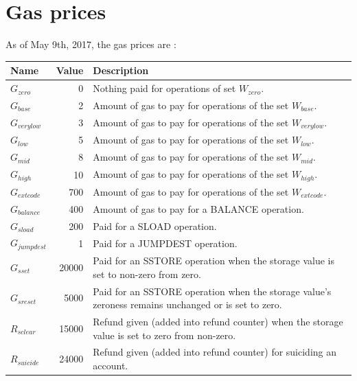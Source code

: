 \documentclass{article}
\begin{document}
	\clearpage


	\appendix

	\section{Gas prices}
		\label{app:gas-prices}

		As of May 9th, 2017, the gas prices are \cite{yellow-paper}: 
		\begin{table}[!ht]
		\footnotesize
		\noindent \begin{tabular}{| l | r | p{8cm} |}
			\hline
			Name 				& Value 	& Description \\ \hline
			$G_{zero}$ 			& 0 		& Nothing paid for operations of set $W_{zero}$. \\ \hline
			$G_{base}$ 			& 2 		& Amount of gas to pay for operations of the set $W_{base}$. \\ \hline
			$G_{verylow}$ 		& 3 		& Amount of gas to pay for operations of the set $W_{verylow}$. \\ \hline
			$G_{low}$ 			& 5 		& Amount of gas to pay for operations of the set $W_{low}$. \\ \hline
			$G_{mid}$ 			& 8 		& Amount of gas to pay for operations of the set $W_{mid}$. \\ \hline
			$G_{high}$ 			& 10 		& Amount of gas to pay for operations of the set $W_{high}$. \\ \hline
			$G_{extcode}$ 		& 700 		& Amount of gas to pay for operations of the set $W_{extcode}$. \\ \hline
			$G_{balance}$ 		& 400 		& Amount of gas to pay for a BALANCE operation. \\ \hline
			$G_{sload}$ 		& 200 		& Paid for a SLOAD operation. \\ \hline
			$G_{jumpdest}$ 		& 1 		& Paid for a JUMPDEST operation. \\ \hline
			$G_{sset}$ 			& 20000 	& Paid for an SSTORE operation when the storage value is set to non-zero from zero. \\ \hline
			$G_{sreset}$ 		& 5000 		& Paid for an SSTORE operation when the storage value's zeroness remains unchanged or is set to zero. \\ \hline
			$R_{sclear}$ 		& 15000		& Refund given (added into refund counter) when the storage value is set to zero from non-zero. \\ \hline
			$R_{suicide}$ 		& 24000 	& Refund given (added into refund counter) for suiciding an account. \\ \hline

\end{tabular}
\end{table}
\end{document}
